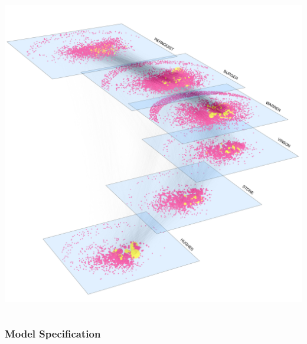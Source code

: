 \documentclass[handout]{beamer}
\begin{document}
\begin{frame}
\begin{columns}
\begin{column}{6cm}
\includegraphics[scale=0.15,clip=true,trim=.5cm 0cm 0cm 2cm]{../../../NetworkVisualizations/citations1}
\end{column}

\end{columns}


\end{frame}

\begin{frame} \frametitle{Model Specification}

\end{frame}
\end{document}
